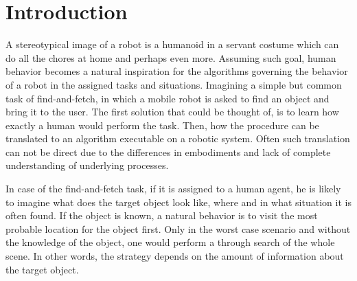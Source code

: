 \chapter{Introduction}
\label{Introduction.ch}
A stereotypical image of a robot is a humanoid in a servant costume which can do all the chores at home and perhaps even more. 
Assuming such goal, human behavior becomes a natural inspiration for the algorithms governing the behavior of a robot in the 
assigned tasks and situations.
Imagining a simple but common task of find-and-fetch, in which a mobile robot is asked to find an object and bring it 
to the user. 
The first solution that could be thought of, is to learn how exactly a human would perform the task. 
Then, how the procedure can be translated to an algorithm executable on a robotic system.
Often such translation can not be direct due to the differences in embodiments and lack of complete understanding of 
underlying processes. 

In case of the find-and-fetch task, if it is assigned to a human agent, he is likely to imagine what does the target 
object look like, where and in what situation it is often found.
If the object is known, a natural behavior is to visit the most probable location for the object first.
Only in the worst case scenario and without the knowledge of the object, one would perform a through search of the 
whole scene.
In other words, the strategy depends on the amount of information about the target object. 

